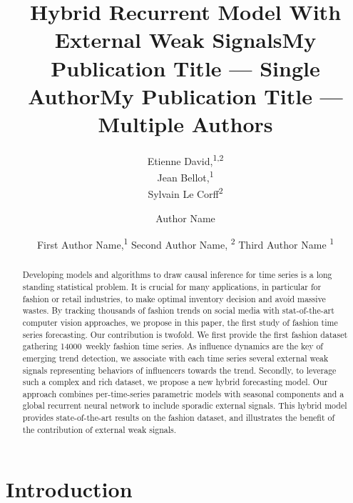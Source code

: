 \documentclass[letterpaper]{article} %
\title{Hybrid Recurrent Model With External Weak Signals}
\author{
    Etienne David,\textsuperscript{\rm 1,\rm 2}\\
    Jean Bellot,\textsuperscript{\rm 1}\\
    Sylvain Le Corff\textsuperscript{\rm 2}\\
}
\title{My Publication Title --- Single Author}
\author {
    Author Name
}
\title{My Publication Title --- Multiple Authors}
\author {
    First Author Name,\textsuperscript{\rm 1}
    Second Author Name, \textsuperscript{\rm 2}
    Third Author Name \textsuperscript{\rm 1}
}
\newcommand{\numberts}{14000}
\begin{document}
\maketitle



\begin{abstract}
Developing models and algorithms to draw causal inference for time series is a long standing statistical problem. It is crucial for many applications, in particular for fashion or retail industries, to make optimal inventory decision and avoid massive wastes. By tracking thousands of fashion trends on social media with stat-of-the-art computer vision approaches, we propose in this paper, the first study of fashion time series forecasting. Our contribution is  twofold. We first provide the first fashion dataset gathering \numberts\ weekly fashion time series. As influence dynamics are the key of emerging trend detection, we associate with each time series several external weak signals representing behaviors of influencers towards the trend. Secondly, to leverage such a complex and rich dataset, we propose a new hybrid forecasting model. Our approach combines per-time-series parametric models with seasonal components and a global recurrent neural network to include sporadic external signals. This hybrid model provides state-of-the-art results on the fashion dataset, and illustrates the benefit of the contribution of  external weak signals.
\end{abstract}


\section{Introduction}
\end{document}
